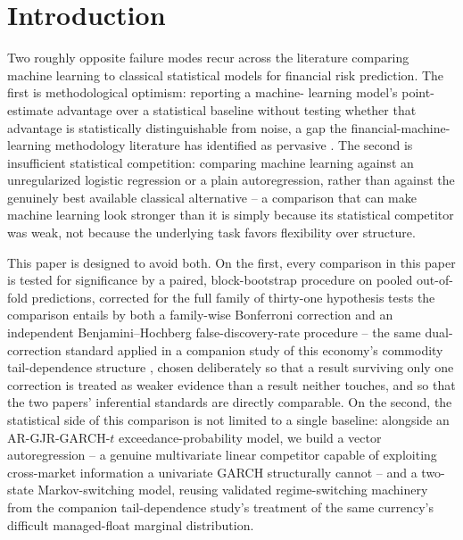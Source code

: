 \documentclass[final,3p,times,authoryear]{elsarticle}
\begin{document}
\section{Introduction}
\label{sec:intro}

Two roughly opposite failure modes recur across the literature comparing
machine learning to classical statistical models for financial risk
prediction. The first is methodological optimism: reporting a machine-
learning model's point-estimate advantage over a statistical baseline
without testing whether that advantage is statistically distinguishable
from noise, a gap the financial-machine-learning methodology literature
has identified as pervasive \citep{deprado2018,vabalas2019}. The second
is insufficient statistical competition: comparing machine learning
against an unregularized logistic regression or a plain autoregression,
rather than against the genuinely best available classical alternative
-- a comparison that can make machine learning look stronger than it is
simply because its statistical competitor was weak, not because the
underlying task favors flexibility over structure.

This paper is designed to avoid both. On the first, every comparison in
this paper is tested for significance by a paired, block-bootstrap
procedure on pooled out-of-fold predictions, corrected for the full
family of thirty-one hypothesis tests the comparison entails by both a
family-wise Bonferroni correction and an independent Benjamini--Hochberg
false-discovery-rate procedure -- the same dual-correction standard
applied in a companion study of this economy's commodity tail-dependence
structure \citep{nelson2026tail}, chosen deliberately so that a result
surviving only one correction is treated as weaker evidence than a
result neither touches, and so that the two papers' inferential
standards are directly comparable. On the second, the statistical side
of this comparison is not limited to a single baseline: alongside an
AR-GJR-GARCH-$t$ exceedance-probability model, we build a vector
autoregression -- a genuine multivariate linear competitor capable of
exploiting cross-market information a univariate GARCH structurally
cannot -- and a two-state Markov-switching model, reusing validated
regime-switching machinery from the companion tail-dependence study's
treatment of the same currency's difficult managed-float marginal
distribution.
\end{document}
